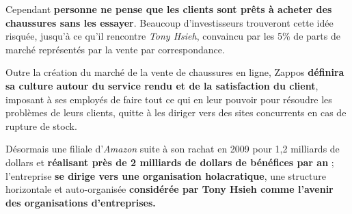 Cependant \textbf{personne ne pense que les clients sont prêts à acheter des chaussures sans les essayer}. Beaucoup d'investisseurs trouveront cette idée risquée, jusqu'à ce qu'il rencontre \textit{Tony Hsieh}, convaincu par les 5\% de parts de marché représentés par la vente par correspondance.

Outre la création du marché de la vente de chaussures en ligne, Zappos \textbf{définira sa culture autour du service rendu et de la satisfaction du client}, imposant à ses employés de faire tout ce qui en leur pouvoir pour résoudre les problèmes de leurs clients, quitte à les diriger vers des sites concurrents en cas de rupture de stock.

Désormais une filiale d'\textit{Amazon} suite à son rachat en 2009 pour 1,2 milliards de dollars et \textbf{réalisant près de 2 milliards de dollars de bénéfices par an}\supercite{ZapposForbes} ; l'entreprise \textbf{se dirige vers une organisation holacratique}, une structure horizontale et auto-organisée \textbf{considérée par Tony Hsieh comme l'avenir des organisations d'entreprises.}